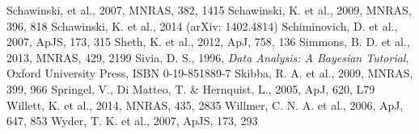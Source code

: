 \documentclass{mn2e}
\begin{document}
\begin{thebibliography}{}
 Schawinski, et al., 2007, MNRAS, 382, 1415
 Schawinski, K. et al., 2009, MNRAS, 396, 818
 Schawinski, K. et al., 2014 (arXiv: 1402.4814)
 Schiminovich, D. et al., 2007, ApJS, 173, 315
 Sheth, K. et al., 2012, ApJ, 758, 136
 Simmons, B. D. et al., 2013, MNRAS, 429, 2199
 Sivia, D. S., 1996, \emph{Data Analysis: A Bayesian Tutorial}, Oxford University Press, ISBN 0-19-851889-7
 Skibba, R. A. et al., 2009, MNRAS, 399, 966
 Springel, V., Di Matteo, T. \& Hernquist, L., 2005, ApJ, 620, L79
 Willett, K. et al., 2014, MNRAS, 435, 2835
 Willmer, C. N. A. et al., 2006, ApJ, 647, 853
 Wyder, T. K. et al., 2007, ApJS, 173, 293
\end{thebibliography}{}
\end{document}
